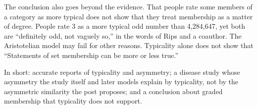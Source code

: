\begin{afterword}
The conclusion also goes beyond the evidence. That people rate some members of a category as more typical does not show that they treat membership as a matter of degree. People rate 3 as a more typical odd number than 4,284,647, yet both are ``definitely odd, not vaguely so,'' in the words of Rips and a coauthor. The Aristotelian model may fail for other reasons. Typicality alone does not show that ``Statements of set membership can be more or less true.''

In short: accurate reports of typicality and asymmetry; a disease study whose asymmetry the study itself and later models explain by typicality, not by the asymmetric similarity the post proposes; and a conclusion about graded membership that typicality does not support.
\end{afterword}

